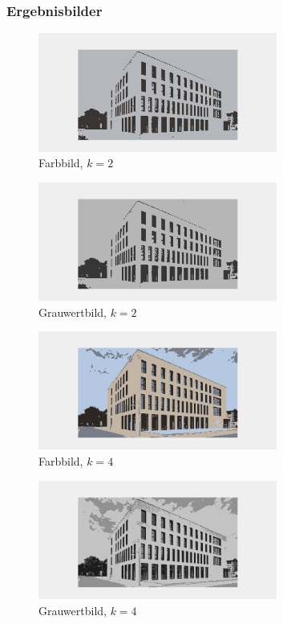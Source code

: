 \documentclass[12pt]{article}
\begin{document}
\subsubsection*{Ergebnisbilder}
\begin{figure}[H]
  \centering
  \includegraphics[width=0.7\textwidth, keepaspectratio]{color2.png}\\
  Farbbild, $k = 2$
\end{figure}
\begin{figure}[H]
  \centering
  \includegraphics[width=0.7\textwidth, keepaspectratio]{gray2.png}\\
  Grauwertbild, $k = 2$
\end{figure}
\begin{figure}[H]
  \centering
  \includegraphics[width=0.7\textwidth, keepaspectratio]{color4.png}\\
  Farbbild, $k = 4$
\end{figure}
\begin{figure}[H]
  \centering
  \includegraphics[width=0.7\textwidth, keepaspectratio]{gray4.png}\\
  Grauwertbild, $k = 4$
\end{figure}
\end{document}
